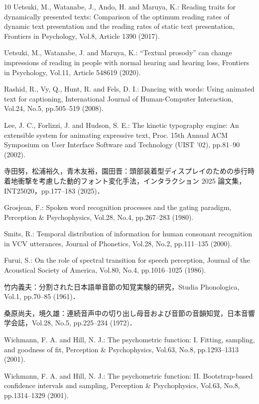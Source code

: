 \begin{thebibliography}{10}
Uetsuki, M., Watanabe, J., Ando, H. and Maruya, K.: Reading traits for dynamically presented texts: Comparison of the optimum reading rates of dynamic text presentation and the reading rates of static text presentation, Frontiers in Psychology, Vol.8, Article 1390 (2017).

Uetsuki, M., Watanabe, J. and Maruya, K.: ``Textual prosody'' can change impressions of reading in people with normal hearing and hearing loss, Frontiers in Psychology, Vol.11, Article 548619 (2020).

Rashid, R., Vy, Q., Hunt, R. and Fels, D. I.: Dancing with words: Using animated text for captioning, International Journal of Human-Computer Interaction, Vol.24, No.5, pp.505--519 (2008).

Lee, J. C., Forlizzi, J. and Hudson, S. E.: The kinetic typography engine: An extensible system for animating expressive text, Proc. 15th Annual ACM Symposium on User Interface Software and Technology (UIST '02), pp.81--90 (2002).

寺田努，松浦裕久，青木友裕，園田晋：頭部装着型ディスプレイのための歩行時着地衝撃を考慮した動的フォント変化手法，インタラクション 2025 論文集，INT25020，pp.177--183 (2025)．

Grosjean, F.: Spoken word recognition processes and the gating paradigm, Perception \& Psychophysics, Vol.28, No.4, pp.267--283 (1980).

Smits, R.: Temporal distribution of information for human consonant recognition in VCV utterances, Journal of Phonetics, Vol.28, No.2, pp.111--135 (2000).

Furui, S.: On the role of spectral transition for speech perception, Journal of the Acoustical Society of America, Vol.80, No.4, pp.1016--1025 (1986).

竹内義夫：分割された日本語単音節の知覚実験的研究，Studia Phonologica, Vol.1, pp.70--85 (1961)．

桑原尚夫，境久雄：連続音声中の切り出し母音および音節の音韻知覚，日本音響学会誌，Vol.28, No.5, pp.225--234 (1972)．

Wichmann, F. A. and Hill, N. J.: The psychometric function: I. Fitting, sampling, and goodness of fit, Perception \& Psychophysics, Vol.63, No.8, pp.1293--1313 (2001).

Wichmann, F. A. and Hill, N. J.: The psychometric function: II. Bootstrap-based confidence intervals and sampling, Perception \& Psychophysics, Vol.63, No.8, pp.1314--1329 (2001).


\end{thebibliography}

